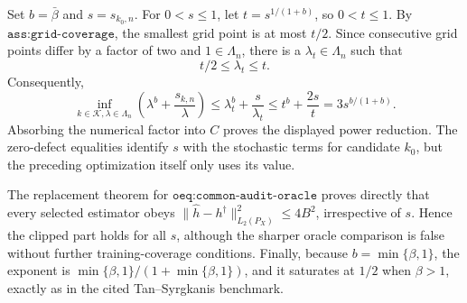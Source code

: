 Set \(b=\bar\beta\) and \(s=s_{k_0,n}\). For \(0<s\le1\), let \(t=s^{1/(1+b)}\), so \(0<t\le1\). By \(\texttt{ass:grid-coverage}\), the smallest grid point is at most \(t/2\). Since consecutive grid points differ by a factor of two and \(1\in\Lambda_n\), there is a \(\lambda_t\in\Lambda_n\) such that
\[
 t/2\le\lambda_t\le t.
\]
Consequently,
\[
 \inf_{k\in\mathcal K,\lambda\in\Lambda_n}
 \left(\lambda^{b}+\frac{s_{k,n}}{\lambda}\right)
 \le \lambda_t^b+\frac{s}{\lambda_t}
 \le t^b+\frac{2s}{t}
 =3s^{b/(1+b)}.
\]
Absorbing the numerical factor into \(C\) proves the displayed power reduction. The zero-defect equalities identify \(s\) with the stochastic terms for candidate \(k_0\), but the preceding optimization itself only uses its value.

The replacement theorem for \(\texttt{oeq:common-audit-oracle}\) proves directly that every selected estimator obeys \(\|\widehat h-h^\dagger\|_{L_2(P_X)}^2\le4B^2\), irrespective of \(s\). Hence the clipped part holds for all \(s\), although the sharper oracle comparison is false without further training-coverage conditions. Finally, because \(b=\min\{\beta,1\}\), the exponent is \(\min\{\beta,1\}/(1+\min\{\beta,1\})\), and it saturates at \(1/2\) when \(\beta>1\), exactly as in the cited Tan--Syrgkanis benchmark.